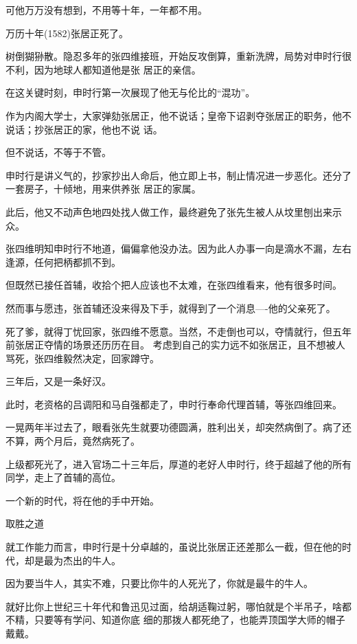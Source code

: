 \documentclass[11pt,a4paper,onecolumn]{article}
\begin{document}
可他万万没有想到，不用等十年，一年都不用。

万历十年(1582)张居正死了。

树倒猢狲散。隐忍多年的张四维接班，开始反攻倒算，重新洗牌，局势对申时行很不利，因为地球人都知道他是张
居正的亲信。

在这关键时刻，申时行第一次展现了他无与伦比的``混功''。

作为内阁大学士，大家弹劾张居正，他不说话；皇帝下诏剥夺张居正的职务，他不说话；抄张居正的家，他也不说
话。

但不说话，不等于不管。

申时行是讲义气的，抄家抄出人命后，他立即上书，制止情况进一步恶化。还分了一套房子，十倾地，用来供养张
居正的家属。

此后，他又不动声色地四处找人做工作，最终避免了张先生被人从坟里刨出来示众。

张四维明知申时行不地道，偏偏拿他没办法。因为此人办事一向是滴水不漏，左右逢源，任何把柄都抓不到。

但既然已接任首辅，收拾个把人应该也不太难，在张四维看来，他有很多时间。

然而事与愿违，张首辅还没来得及下手，就得到了一个消息----他的父亲死了。

死了爹，就得丁忧回家，张四维不愿意。当然，不走倒也可以，夺情就行，但五年前张居正夺情的场景还历历在目。
考虑到自己的实力远不如张居正，且不想被人骂死，张四维毅然决定，回家蹲守。

三年后，又是一条好汉。

此时，老资格的吕调阳和马自强都走了，申时行奉命代理首辅，等张四维回来。

一晃两年半过去了，眼看张先生就要功德圆满，胜利出关，却突然病倒了。病了还不算，两个月后，竟然病死了。

上级都死光了，进入官场二十三年后，厚道的老好人申时行，终于超越了他的所有同学，走上了首辅的高位。

一个新的时代，将在他的手中开始。

取胜之道

就工作能力而言，申时行是十分卓越的，虽说比张居正还差那么一截，但在他的时代，却是最为杰出的牛人。

因为要当牛人，其实不难，只要比你牛的人死光了，你就是最牛的牛人。

就好比你上世纪三十年代和鲁迅见过面，给胡适鞠过躬，哪怕就是个半吊子，啥都不精，只要等有学问、知道你底
细的那拨人都死绝了，也能弄顶国学大师的帽子戴戴。

\section[\thesection]{}
\end{document}
